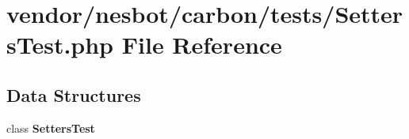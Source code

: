 \section{vendor/nesbot/carbon/tests/\+Setters\+Test.php File Reference}
\label{_setters_test_8php}
\subsection*{Data Structures}
\begin{DoxyCompactItemize}
\item 
class {\bf Setters\+Test}
\end{DoxyCompactItemize}
